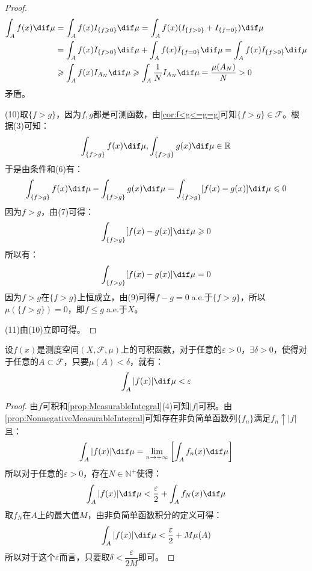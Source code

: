 \begin{proof}
	\begin{align*}
		\int_{A}f(x)\dif\mu&=\int_{A}f(x)I_{\{f\geqslant0\}}\dif\mu=\int_{A}f(x)(I_{\{f>0\}}+I_{\{f=0\}})\dif\mu \\
		&=\int_{A}f(x)I_{\{f>0\}}\dif\mu+\int_{A}f(x)I_{\{f=0\}}\dif\mu=\int_{A}f(x)I_{\{f>0\}}\dif\mu \\
		&\geqslant\int_{A}f(x)I_{A_N}\dif\mu\geqslant\int_{A}\frac{1}{N}I_{A_N}\dif\mu=\frac{\mu(A_N)}{N}>0
	\end{align*}
	矛盾。\par
	(10)取$\{f>g\}$，因为$f,g$都是可测函数，由\cref{cor:f<g<=g=g}可知$\{f>g\}\in \mathscr{F}$。根据(3)可知：
	\begin{equation*}
		\int_{\{f>g\}}f(x)\dif\mu,\int_{\{f>g\}}g(x)\dif\mu\in\mathbb{R}^{}
	\end{equation*}
	于是由条件和(6)有：
	\begin{equation*}
		\int_{\{f>g\}}f(x)\dif\mu-\int_{\{f>g\}}g(x)\dif\mu=\int_{\{f>g\}}[f(x)-g(x)]\dif\mu\leqslant0
	\end{equation*}
	因为$f>g$，由(7)可得：
	\begin{equation*}
		\int_{\{f>g\}}[f(x)-g(x)]\dif\mu\geqslant0
	\end{equation*}
	所以有：
	\begin{equation*}
		\int_{\{f>g\}}[f(x)-g(x)]\dif\mu=0
	\end{equation*}
	因为$f>g$在$\{f>g\}$上恒成立，由(9)可得$f-g=0\;$a.e.于$\{f>g\}$，所以$\mu(\{f>g\})=0$，即$f\leqslant g\;$a.e.于$X$。\par
	(11)由(10)立即可得。
\end{proof}
\begin{theorem}[积分的绝对连续性]
	设$f(x)$是测度空间$(X,\mathscr{F},\mu)$上的可积函数，对于任意的$\varepsilon>0$，$\exists\delta>0$，使得对于任意的$A\subset\mathscr{F}$，只要$\mu(A)<\delta$，就有：
	\begin{equation*}
		\int_{A}|f(x)|\dif\mu<\varepsilon
	\end{equation*}
\end{theorem}
\begin{proof}
	由$f$可积和\cref{prop:MeasurableIntegral}(4)可知$|f|$可积。由\cref{prop:NonnegativeMeasurableIntegral}可知存在非负简单函数列$\{f_n\}$满足$f_n\uparrow |f|$且：
	\begin{equation*}
		\int_{A}|f(x)|\dif\mu=\lim_{n\to+\infty}\left[\int_{A}f_n(x)\dif\mu\right]
	\end{equation*}
	所以对于任意的$\varepsilon>0$，存在$N\in\mathbb{N}^+$使得：
	\begin{equation*}
		\int_{A}|f(x)|\dif\mu<\frac{\varepsilon}{2}+\int_{A}f_N(x)\dif\mu
	\end{equation*}
	取$f_N$在$A$上的最大值$M$，由非负简单函数积分的定义可得：
	\begin{equation*}
		\int_{A}|f(x)|\dif\mu<\frac{\varepsilon}{2}+M\mu(A)
	\end{equation*}
	所以对于这个$\varepsilon$而言，只要取$\delta<\dfrac{\varepsilon}{2M}$即可。
\end{proof}
